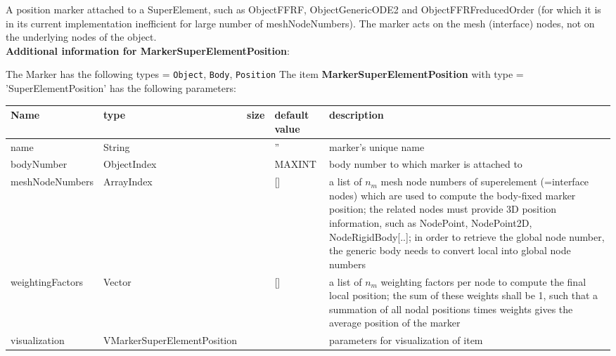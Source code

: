 \label{sec:item:MarkerSuperElementPosition}
A position marker attached to a SuperElement, such as ObjectFFRF, ObjectGenericODE2 and ObjectFFRFreducedOrder (for which it is in its current implementation inefficient for large number of meshNodeNumbers). The marker acts on the mesh (interface) nodes, not on the underlying nodes of the object.\vspace{12pt}
 \\{\bf Additional information for MarkerSuperElementPosition}:
\bi
  \item The Marker has the following types = \texttt{Object}, \texttt{Body}, \texttt{Position}
\ei
\vspace{12pt} \noindent The item {\bf MarkerSuperElementPosition} with type = 'SuperElementPosition' has the following parameters:\vspace{-1cm}\\ 
\begin{center}
  \footnotesize
  \begin{longtable}{| p{4.5cm} | p{2.5cm} | p{0.5cm} | p{2.5cm} | p{6cm} |}
    \hline
    \bf Name & \bf type & \bf size & \bf default value & \bf description \\ \hline
    name &     String &      &     '' &     marker's unique name\\ \hline
    bodyNumber &     ObjectIndex &      &     MAXINT &     body number to which marker is attached to\\ \hline
    meshNodeNumbers &     ArrayIndex &      &     [] &     a list of $n_m$ mesh node numbers of superelement (=interface nodes) which are used to compute the body-fixed marker position; the related nodes must provide 3D position information, such as NodePoint, NodePoint2D, NodeRigidBody[..]; in order to retrieve the global node number, the generic body needs to convert local into global node numbers\\ \hline
    weightingFactors &     Vector &      &     [] &     a list of $n_m$ weighting factors per node to compute the final local position; the sum of these weights shall be 1, such that a summation of all nodal positions times weights gives the average position of the marker\\ \hline
    visualization & VMarkerSuperElementPosition & & & parameters for visualization of item \\ \hline
	  \end{longtable}
	\end{center}
